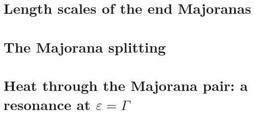 \section{Length scales of the end Majoranas}
\label{sec:lengths}

\section{The Majorana splitting}
\label{sec:splitting}

\section{Heat through the Majorana pair: a resonance at \texorpdfstring{$\varepsilon=\Gamma$}{epsilon = Gamma}}
\label{sec:resonance}

